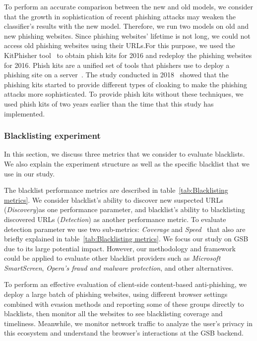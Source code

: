 To perform an accurate comparison between the new and old models, we consider that the growth in sophistication of recent phishing attacks may weaken the classifier's results with the new model. Therefore, we run two models on old and new phishing websites.
Since phishing websites' lifetime is not long, we could not access old phishing websites using their URLs.For this purpose, we used the KitPhisher tool~\cite{cybercdh} to obtain phish kits for 2016 and redeploy the phishing websites for 2016.
Phish kits are a unified set of tools that phishers use to deploy a phishing site on a server~\cite{mccalley2011analysis}. The study conducted in 2018~\cite{oest2018inside} showed that the phishing kits started to provide different types of cloaking to make the phishing attacks more sophisticated. To provide phish kits without these techniques, we used phish kits of two years earlier than the time that this study has implemented.

\subsubsection{Blacklisting experiment}
In this section, we discuss three metrics that we consider to evaluate blacklists. We also explain the experiment structure as well as the specific blacklist that we use in our study. 

The blacklist performance metrics are described in table~\ref{tab:Blacklisting metrics}. We consider blacklist's ability to discover new suspected URLs
(\textit{Discovery})as one performance parameter, and blacklist's ability to blacklisting discovered URLs (\textit{Detection})  as another performance metric. To evaluate detection parameter we use two sub-metrics: \textit{Coverage} and \textit{Speed}~\cite{oest2020phishtime} that also are briefly explained in table~\ref{tab:Blacklisting metrics}. 
We focus our study on GSB due to its large potential impact. However, our methodology and framework could be applied to evaluate other blacklist providers such as \textit{Microsoft SmartScreen}, \textit{Opera’s fraud and malware protection}, and other alternatives.

To perform an effective evaluation of client-side content-based anti-phishing, we deploy a large batch of phishing websites, using different browser settings combined with evasion methods and reporting some of these groups directly to blacklists, then monitor all the websites to see blacklisting coverage and timeliness. Meanwhile, we monitor network traffic to analyze the user's privacy in this ecosystem and understand the browser's interactions at the GSB backend.


